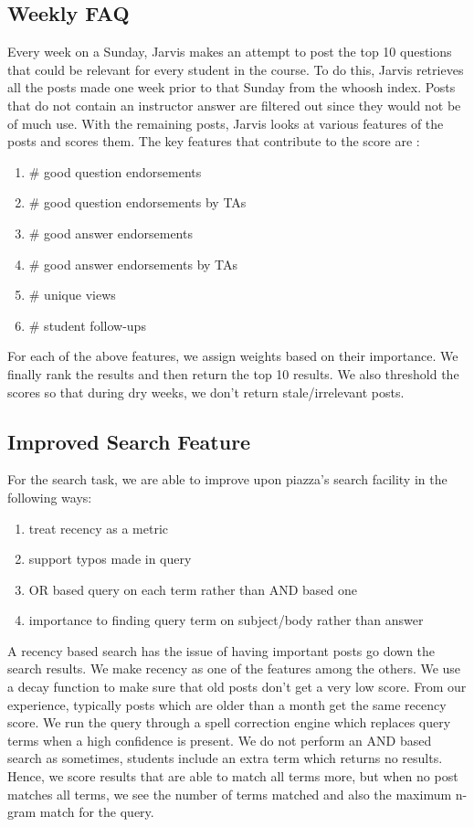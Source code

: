 \documentclass[sigconf]{acmart}
\begin{document}
\subsection{Weekly FAQ}
Every week on a Sunday, Jarvis makes an attempt to post the top 10 questions that could be relevant for every student in the course. To do this, Jarvis retrieves all the posts made one week prior to that Sunday from the whoosh index. Posts that do not contain an instructor answer are filtered out since they would not be of much use. With the remaining posts, Jarvis looks at various features of the posts and scores them. The key features that contribute to the score are :

\begin{enumerate}
  \item \# good question endorsements
  \item \# good question endorsements by TAs
  \item \# good answer endorsements
  \item \# good answer endorsements by TAs
  \item \# unique views
  \item \# student follow-ups
\end{enumerate}

For each of the above features, we assign weights based on their importance. We finally rank the results and then return the top 10 results. We also threshold the scores so that during dry weeks, we don't return stale/irrelevant posts.

\subsection{Improved Search Feature}
For the search task, we are able to improve upon piazza's search facility in the following ways:
\begin{enumerate}
\item treat recency as a metric
\item support typos made in query
\item OR based query on each term rather than AND based one
\item importance to finding query term on subject/body rather than answer
\end{enumerate}

A recency based search has the issue of having important posts go down the search results. We make recency as one of the features among the others. We use a decay function to make sure that old posts don't get a very low score. From our experience, typically posts which are older than a month get the same recency score. We run the query through a spell correction engine which replaces query terms when a high confidence is present. We do not perform an AND based search as sometimes, students include an extra term which returns no results. Hence, we score results that are able to match all terms more, but when no post matches all terms, we see the number of terms matched and also the maximum n-gram match for the query. 
\end{document}
